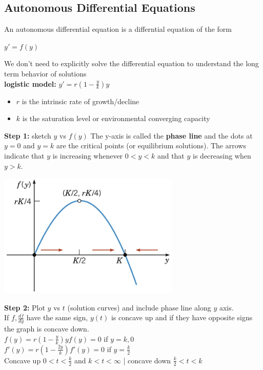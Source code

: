 \documentclass{article}
\begin{document}
\subsection{Autonomous Differential Equations}
\label{sec:fautonomous}
An autonomous differential equation is a differntial equation of the form
\begin{center}
    $y'=f(y)$
\end{center}
We don't need to explicitly solve the differential equation to understand the long term behavior of solutions\\
\textbf{logistic model:} $y'=r(1-\frac{y}{k})y$
\begin{itemize}
    \item $r$ is the intrinsic rate of growth/decline
    \item $k$ is the saturation level or environmental converging capacity
\end{itemize}
\textbf{Step 1:} sketch $y$ vs $f(y)$
The y-axis is called the \textbf{phase line} and the dots at $y=0$ and $y=k$ are the critical points (or equilibrium solutions). The arrows indicate that $y$ is increasing whenever $0<y<k$ and that $y$ is decreasing when $y>k$.
\begin{center}
    \includegraphics[scale=0.6]{yvsfy.png}
\end{center}
\textbf{Step 2:} Plot $y$ vs $t$ (solution curves) and include phase line along $y$ axis.\\
If $f,\frac{df}{dy}$ have the same sign, $y(t)$ is concave up and if they have opposite signs the graph is concave down.\\
$f(y)=r(1-\frac{y}{k})y$\hspace*{0.25in}$f(y)=0$ if $y=k,0$\\
$f'(y)=r(1-\frac{2y}{k})$\hspace*{0.25in}$f'(y)=0$ if $y=\frac{k}{2}$\\
Concave up $0<t<\frac{k}{2}$ and $k<t<\infty$ | concave down $\frac{k}{2}<t<k$
\end{document}
